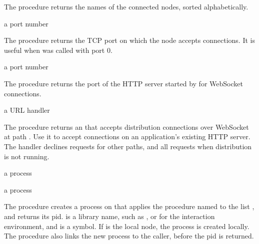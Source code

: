 The  procedure returns the names of the connected
nodes, sorted alphabetically.

\begin{procedure}
\end{procedure}
\returns{} a port number

The  procedure returns the TCP port on which the
node accepts connections. It is useful when 
was called with port 0.

\begin{procedure}
\end{procedure}
\returns{} a port number

The  procedure returns the port of the HTTP
server started by  for WebSocket connections.

\begin{procedure}
\end{procedure}
\returns{} a URL handler

The  procedure returns an
 that accepts distribution connections over
WebSocket at path . Use it to accept connections on an
application's existing HTTP server. The handler declines requests for
other paths, and all requests when distribution is not running.

\begin{procedure}
\end{procedure}
\returns{} a process

\begin{procedure}
\end{procedure}
\returns{} a process

The  procedure creates a process on  that
applies the procedure named  to the list , and
returns its pid.  is a library name, such as , or  for the interaction environment, and  is
a symbol. If  is the local node, the process is created
locally. The  procedure also links the new
process to the caller, before the pid is returned.

